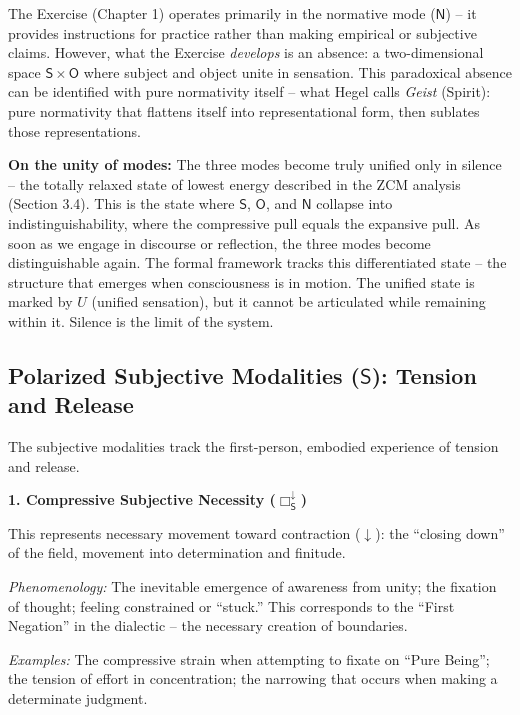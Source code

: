 \documentclass[12pt]{book}
\newcommand{\SBoxDown}{\Box_{\mathsf{S}}^{\downarrow}}
\begin{document}
The Exercise (Chapter 1) operates primarily in the normative mode ($\mathsf{N}$) -- it provides instructions for practice rather than making empirical or subjective claims. However, what the Exercise \textit{develops} is an absence: a two-dimensional space $\mathsf{S} \times \mathsf{O}$ where subject and object unite in sensation. This paradoxical absence can be identified with pure normativity itself -- what Hegel calls \textit{Geist} (Spirit): pure normativity that flattens itself into representational form, then sublates those representations.

\textbf{On the unity of modes:} The three modes become truly unified only in silence -- the totally relaxed state of lowest energy described in the ZCM analysis (Section 3.4). This is the state where $\mathsf{S}$, $\mathsf{O}$, and $\mathsf{N}$ collapse into indistinguishability, where the compressive pull equals the expansive pull. As soon as we engage in discourse or reflection, the three modes become distinguishable again. The formal framework tracks this differentiated state -- the structure that emerges when consciousness is in motion. The unified state is marked by $U$ (unified sensation), but it cannot be articulated while remaining within it. Silence is the limit of the system.

\subsection{Polarized Subjective Modalities ($\mathsf{S}$): Tension and Release}

The subjective modalities track the first-person, embodied experience of tension and release.

\bigskip

\noindent\textbf{1. Compressive Subjective Necessity ($\SBoxDown$)}

This represents necessary movement toward contraction ($\downarrow$): the ``closing down'' of the field, movement into determination and finitude.

\textit{Phenomenology:} The inevitable emergence of awareness from unity; the fixation of thought; feeling constrained or ``stuck.'' This corresponds to the ``First Negation'' in the dialectic -- the necessary creation of boundaries.

\textit{Examples:} The compressive strain when attempting to fixate on ``Pure Being''; the tension of effort in concentration; the narrowing that occurs when making a determinate judgment.

\bigskip
\end{document}
